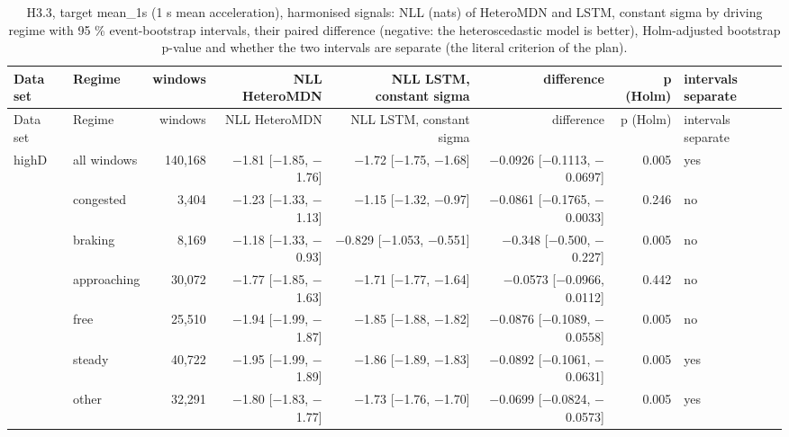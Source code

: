\begingroup
\footnotesize
\begin{longtable}{llrrrrrl}
\caption{H3.3, target mean\_1s (1 s mean acceleration), harmonised signals: NLL (nats) of HeteroMDN and LSTM, constant sigma by driving regime with 95 \% event-bootstrap intervals, their paired difference (negative: the heteroscedastic model is better), Holm-adjusted bootstrap p-value and whether the two intervals are separate (the literal criterion of the plan).}\label{tab:t3-h33-nll--harmonised--mean-1s} \\
\toprule
Data set & Regime & windows & NLL HeteroMDN & NLL LSTM, constant sigma & difference & p (Holm) & intervals separate \\
\midrule
\endfirsthead
\toprule
Data set & Regime & windows & NLL HeteroMDN & NLL LSTM, constant sigma & difference & p (Holm) & intervals separate \\
\midrule
\endhead
\bottomrule
\endlastfoot
highD & all windows & 140,168 & $-$1.81 [$-$1.85, $-$1.76] & $-$1.72 [$-$1.75, $-$1.68] & $-$0.0926 [$-$0.1113, $-$0.0697] & 0.005 & yes \\
 & congested & 3,404 & $-$1.23 [$-$1.33, $-$1.13] & $-$1.15 [$-$1.32, $-$0.97] & $-$0.0861 [$-$0.1765, $-$0.0033] & 0.246 & no \\
 & braking & 8,169 & $-$1.18 [$-$1.33, $-$0.93] & $-$0.829 [$-$1.053, $-$0.551] & $-$0.348 [$-$0.500, $-$0.227] & 0.005 & no \\
 & approaching & 30,072 & $-$1.77 [$-$1.85, $-$1.63] & $-$1.71 [$-$1.77, $-$1.64] & $-$0.0573 [$-$0.0966, 0.0112] & 0.442 & no \\
 & free & 25,510 & $-$1.94 [$-$1.99, $-$1.87] & $-$1.85 [$-$1.88, $-$1.82] & $-$0.0876 [$-$0.1089, $-$0.0558] & 0.005 & no \\
 & steady & 40,722 & $-$1.95 [$-$1.99, $-$1.89] & $-$1.86 [$-$1.89, $-$1.83] & $-$0.0892 [$-$0.1061, $-$0.0631] & 0.005 & yes \\
 & other & 32,291 & $-$1.80 [$-$1.83, $-$1.77] & $-$1.73 [$-$1.76, $-$1.70] & $-$0.0699 [$-$0.0824, $-$0.0573] & 0.005 & yes \\

\end{longtable}
